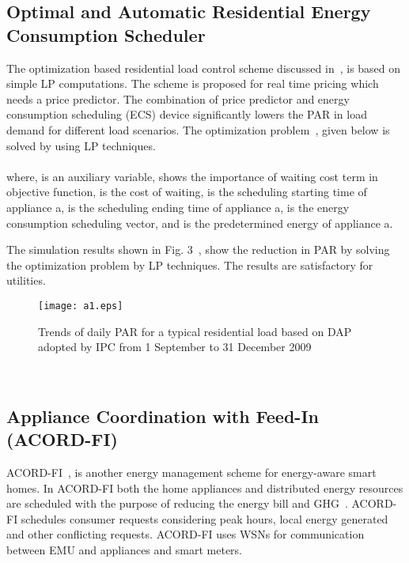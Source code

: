 \documentclass[journal]{IEEEtran}
\begin{document}
\subsection{Optimal and Automatic Residential Energy Consumption Scheduler}
 The optimization based residential load control scheme discussed in~\cite{mohsenian2010optimal}, is based on simple LP computations. The scheme is proposed for real time pricing which needs a price predictor. The combination of price predictor and energy consumption scheduling (ECS) device significantly lowers the PAR in load demand for different load scenarios. The optimization problem~\cite{mohsenian2010optimal}, given below is solved by using LP techniques.\\
\\
where,  is an auxiliary variable,  shows the importance of waiting cost term in objective function,  is the cost of waiting,  is the scheduling starting time of appliance a,  is the scheduling ending time of appliance a,  is the energy consumption scheduling vector, and  is the predetermined energy of appliance a.


The simulation results shown in Fig. 3~\cite{mohsenian2010optimal}, show the reduction in PAR by solving the optimization problem by LP techniques. The results are satisfactory for utilities.
\begin{figure}[!h]
\centering
\texttt{[image: a1.eps]}
\caption{Trends of daily PAR for a typical residential load based on DAP adopted by IPC from 1 September to 31 December 2009 }
\end{figure}\\
\subsection{Appliance Coordination with Feed-In (ACORD-FI)}
ACORD-FI~\cite{erol2010using}, is another energy management scheme for energy-aware smart homes. In ACORD-FI both the home appliances and distributed energy resources are scheduled with the purpose of reducing the energy bill and GHG~\cite{erol2010using}. ACORD-FI schedules consumer requests considering peak hours, local energy generated and other conflicting requests. ACORD-FI uses WSNs for communication between EMU and appliances and smart meters.\\
\end{document}
